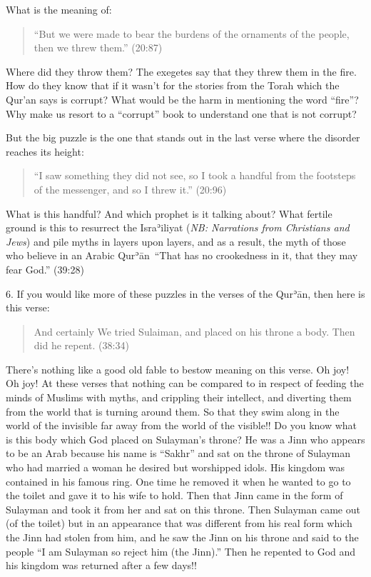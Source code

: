 \documentclass[12pt]{memoir}
\def\´{ʾ} %
\def \Quran{Qur\-\´ān} %
\newcommand{\QRef}[1]{{\color{darkblue}#1}}
\newcommand{\NB}[1]{\emph{\small NB: #1}}
\begin{document}
What is the meaning of:

\begin{quote}
“But we were made to bear the burdens of the ornaments of the people,
then we threw them.” (\QRef{20:87})
\end{quote}

Where did they throw them?
The exegetes say that they threw them in the fire.
How do they know that if it wasn’t for the stories
from the Torah which the Qur’an says is corrupt?
What would be the harm in mentioning the word “fire”?
Why make us resort to a “corrupt” book
to understand one that is not corrupt?

But the big puzzle is the one that stands out in the last verse
where the disorder reaches its height:

\begin{quote}
“I saw something they did not see, so I took a handful
from the footsteps of the messenger, and so I threw it.”
(\QRef{20:96})
\end{quote}

What is this handful? And which prophet is it talking about?
What fertile ground is this to resurrect the Isra\´iliyat
(\NB{Narrations from Christians and Jews})
and pile myths in layers upon layers, and as a result,
the myth of those who believe in an Arabic \Quran\
“That has no crookedness in it, that they may fear God.”
(\QRef{39:28})

6. If you would like more of these puzzles in the verses of the \Quran,
then here is this verse:

\begin{quote}
And certainly We tried Sulaiman, and placed on his throne a body.
Then did he repent. (\QRef{38:34})
\end{quote}

There’s nothing like a good old fable to bestow meaning on this verse.
Oh joy! Oh joy!
At these verses that nothing can be compared to in respect
of feeding the minds of Muslims with myths, and crippling their intellect,
and diverting them from the world that is turning around them.
So that they swim along in the world of the invisible far away from
the world of the visible!!
Do you know what is this body which God placed on Sulayman’s throne?
He was a Jinn who appears to be an Arab because his name is “Sakhr”
and sat on the throne of Sulayman who had married a woman
he desired but worshipped idols.
His kingdom was contained in his famous ring.
One time he removed it when he wanted to go to the toilet
and gave it to his wife to hold.
Then that Jinn came in the form of Sulayman and took it from her
and sat on this throne.
Then Sulayman came out (of the toilet) but in an appearance
that was different from his real form which the Jinn had stolen from him,
and he saw the Jinn on his throne and said to the people
“I am Sulayman so reject him (the Jinn).”
Then he repented to God and his kingdom was returned after a few days!!
\end{document}
